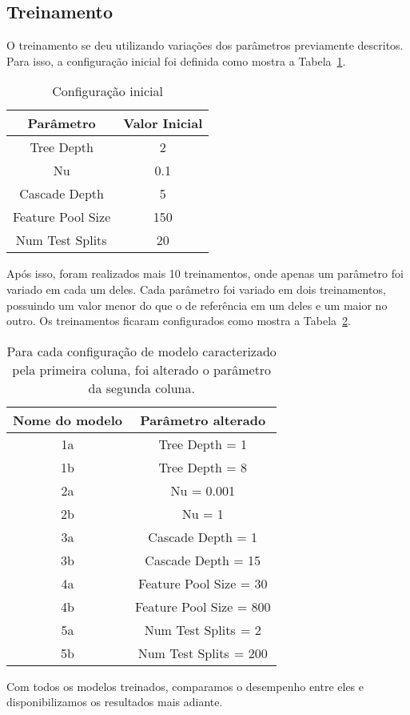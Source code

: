 \documentclass[twoside,conference,a4paper]{IEEEtran}
\begin{document}
\subsection{Treinamento}
O treinamento se deu utilizando variações dos parâmetros previamente descritos. Para isso, a configuração inicial foi definida como mostra a Tabela~\ref{tab:conf0}.

\begin{table}[]
    \centering
    \begin{tabular}{|cc|}
    \hline
    Parâmetro & Valor Inicial\\
    \hline
    Tree Depth & 2\\
    \hline
    Nu & 0.1\\
    \hline
    Cascade Depth & 5\\
    \hline
    Feature Pool Size & 150\\
    \hline
    Num Test Splits  & 20\\
    \hline      
    \end{tabular}
    \caption{Configuração inicial}
    \label{tab:conf0}
\end{table}

Após isso, foram realizados mais 10 treinamentos, onde apenas um parâmetro foi variado em cada um deles. Cada parâmetro foi variado em dois treinamentos, possuindo um valor menor do que o de referência em um deles e um maior no outro. Os treinamentos ficaram configurados como mostra a Tabela~\ref{tab:modelo}.
\begin{table}[]
    \centering
    \begin{tabular}{|cc|}
    \hline
    Nome do modelo & Parâmetro alterado\\
    \hline
    1a & Tree Depth = 1\\
    \hline
    1b & Tree Depth = 8\\
    \hline
    2a & Nu = 0.001\\
    \hline
    2b & Nu = 1\\
    \hline
    3a & Cascade Depth = 1\\
    \hline
    3b & Cascade Depth = 15\\
    \hline
    4a & Feature Pool Size = 30\\
    \hline
    4b & Feature Pool Size = 800\\
    \hline
    5a & Num Test Splits  = 2\\
    \hline
    5b & Num Test Splits  = 200\\
    \hline
    \end{tabular}
    \caption{Para cada configuração de modelo caracterizado pela primeira coluna, foi alterado o parâmetro da segunda coluna.}
    \label{tab:modelo}
\end{table}
Com todos os modelos treinados, comparamos o desempenho entre eles e disponibilizamos os resultados mais adiante.
\end{document}
